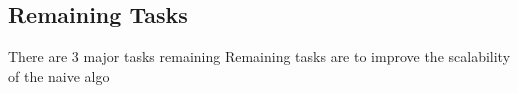 \documentclass[conference]{IEEEtran}
\begin{document}
\subsection{Remaining Tasks}
There are 3 major tasks remaining 
Remaining tasks are to improve the scalability of the naive algo

%
%



%
%
\end{document}

